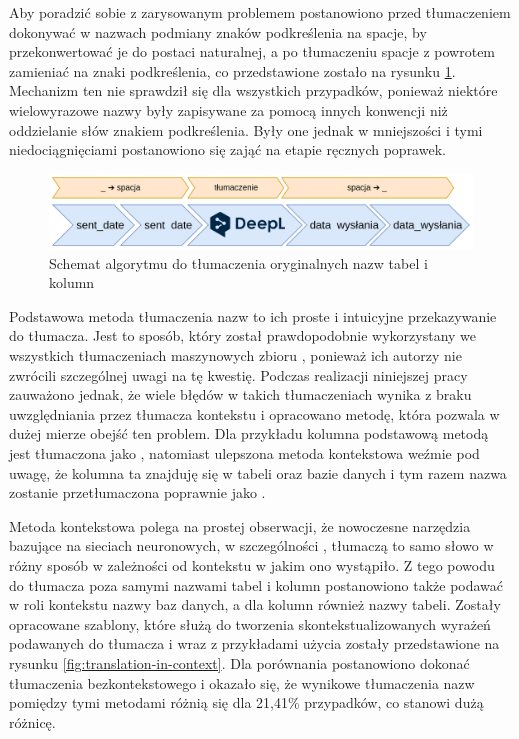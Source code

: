 Aby poradzić sobie z zarysowanym problemem postanowiono przed tłumaczeniem dokonywać w nazwach podmiany znaków podkreślenia na spacje, by przekonwertować je do postaci naturalnej, a po tłumaczeniu spacje z powrotem zamieniać na znaki podkreślenia, co przedstawione zostało na rysunku \ref{fig:multi-word-translation}. Mechanizm ten nie sprawdził się dla wszystkich przypadków, ponieważ niektóre wielowyrazowe nazwy były zapisywane za pomocą innych konwencji niż oddzielanie słów znakiem podkreślenia. Były one jednak w mniejszości i tymi niedociągnięciami postanowiono się zająć na etapie ręcznych poprawek.

\begin{figure}[ht!]
  \centering
  \includegraphics[width=1.0\linewidth]{images/multi_word_translation.png}
  \caption{Schemat algorytmu do tłumaczenia oryginalnych nazw tabel i kolumn}
  \label{fig:multi-word-translation}
\end{figure}

Podstawowa metoda tłumaczenia nazw to ich proste i intuicyjne przekazywanie do tłumacza. Jest to sposób, który został prawdopodobnie wykorzystany we wszystkich tłumaczeniach maszynowych zbioru , ponieważ ich autorzy nie zwrócili szczególnej uwagi na tę kwestię. Podczas realizacji niniejszej pracy zauważono jednak, że wiele błędów w takich tłumaczeniach wynika z braku uwzględniania przez tłumacza kontekstu i opracowano metodę, która pozwala w dużej mierze obejść ten problem. Dla przykładu kolumna  podstawową metodą jest tłumaczona jako , natomiast ulepszona metoda kontekstowa weźmie pod uwagę, że kolumna ta znajduję się w tabeli  oraz bazie danych  i tym razem nazwa zostanie przetłumaczona poprawnie jako .

Metoda kontekstowa polega na prostej obserwacji, że nowoczesne narzędzia bazujące na sieciach neuronowych, w szczególności , tłumaczą to samo słowo w różny sposób w zależności od kontekstu w jakim ono wystąpiło. Z tego powodu do tłumacza poza samymi nazwami tabel i kolumn postanowiono także podawać w roli kontekstu nazwy baz danych, a dla kolumn również nazwy tabeli. Zostały opracowane szablony, które służą do tworzenia skontekstualizowanych wyrażeń podawanych do tłumacza i wraz z przykładami użycia zostały przedstawione na rysunku \ref{fig:translation-in-context}. Dla porównania postanowiono dokonać tłumaczenia bezkontekstowego i okazało się, że wynikowe tłumaczenia nazw pomiędzy tymi metodami różnią się dla 21,41\% przypadków, co stanowi dużą różnicę.

